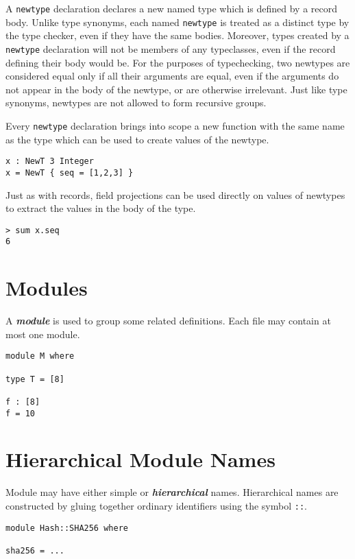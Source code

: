 A \texttt{newtype} declaration declares a new named type which is
defined by a record body. Unlike type synonyms, each named
\texttt{newtype} is treated as a distinct type by the type checker, even
if they have the same bodies. Moreover, types created by a
\texttt{newtype} declaration will not be members of any typeclasses,
even if the record defining their body would be. For the purposes of
typechecking, two newtypes are considered equal only if all their
arguments are equal, even if the arguments do not appear in the body of
the newtype, or are otherwise irrelevant. Just like type synonyms,
newtypes are not allowed to form recursive groups.

Every \texttt{newtype} declaration brings into scope a new function with
the same name as the type which can be used to create values of the
newtype.

\begin{verbatim}
x : NewT 3 Integer
x = NewT { seq = [1,2,3] }
\end{verbatim}

Just as with records, field projections can be used directly on values
of newtypes to extract the values in the body of the type.

\begin{verbatim}
> sum x.seq
6
\end{verbatim}

\section{Modules}\label{modules}

A \textbf{\emph{module}} is used to group some related definitions. Each
file may contain at most one module.

\begin{verbatim}
module M where

type T = [8]

f : [8]
f = 10
\end{verbatim}

\section{Hierarchical Module Names}\label{hierarchical-module-names}

Module may have either simple or \textbf{\emph{hierarchical}} names.
Hierarchical names are constructed by gluing together ordinary
identifiers using the symbol \texttt{::}.

\begin{verbatim}
module Hash::SHA256 where

sha256 = ...
\end{verbatim}


